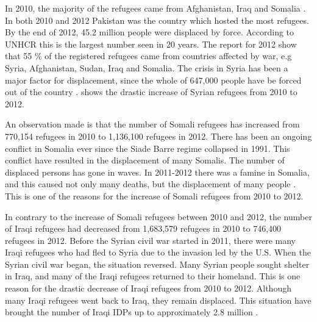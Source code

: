 In 2010, the majority of the refugees came from Afghanistan, Iraq and Somalia \cite{UNHCRstat2010}. In both 2010 and 2012 Pakistan was the country which hosted the most refugees. By the end of 2012, 45.2 million people were displaced by force. According to UNHCR this is the largest number seen in 20 years. The report for 2012 show that 55 \% of the registered refugees came from countries affected by war, e.g Syria, Afghanistan, Sudan, Iraq and Somalia. The crisis in Syria has been a major factor for displacement, since the whole of 647,000 people have be forced out of the country \cite{UNHCRstat2012}.  shows the drastic increase of Syrian refugees from 2010 to 2012. 

An observation made is that the number of Somali refugees has increased from 770,154 refugees in 2010 to 1,136,100 refugees in 2012. There has been an ongoing conflict in Somalia ever since the Siade Barre regime collapsed in 1991. This conflict have resulted in the displacement of many Somalis. The number of displaced persons has gone in waves. In 2011-2012 there was a famine in Somalia, and this caused not only many deaths, but the displacement of many people \cite{somalia}. This is one of the reasons for the increase of Somali refugees from 2010 to 2012. 

In contrary to the increase of Somali refugees between 2010 and 2012, the number of Iraqi refugees had decreased from 1,683,579 refugees in 2010 to 746,400 refugees in 2012. Before the Syrian civil war started in 2011, there were many Iraqi refugees who had fled to Syria due to the invasion led by the U.S. When the Syrian civil war began, the situation reversed. Many Syrian people sought shelter in Iraq, and many of the Iraqi refugees returned to their homeland. This is one reason for the drastic decrease of Iraqi refugees from 2010 to 2012. Although many Iraqi refugees went back to Iraq, they remain displaced. This situation have brought the number of Iraqi IDPs up to approximately 2.8 million \citep{iraq}. 

